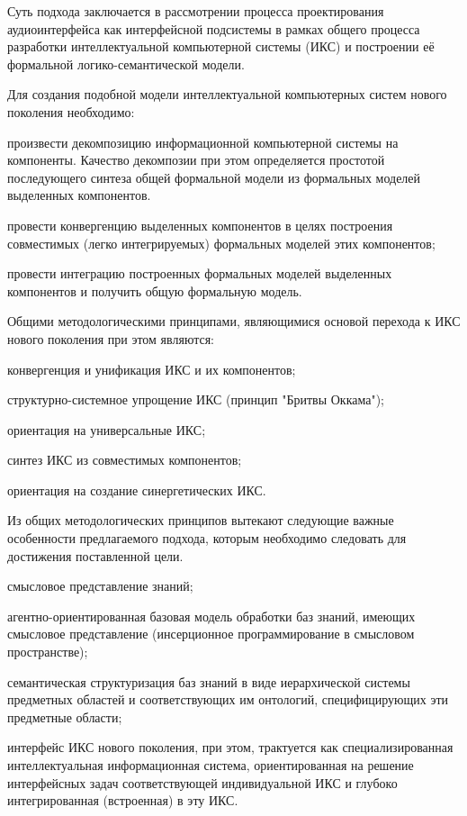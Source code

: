 Суть подхода заключается в рассмотрении процесса проектирования аудиоинтерфейса как интерфейсной подсистемы в рамках общего процесса разработки интеллектуальной компьютерной системы (ИКС) и построении её формальной логико-семантической модели.

Для создания подобной модели интеллектуальной компьютерных систем нового поколения необходимо:
\begin{textitemize}    
    \item произвести декомпозицию информационной компьютерной системы на компоненты. Качество декомпозии при этом определяется простотой последующего синтеза общей формальной модели из формальных моделей выделенных компонентов.
    \item провести конвергенцию выделенных компонентов в целях построения совместимых (легко интегрируемых) формальных моделей этих компонентов;
    \item провести интеграцию построенных формальных моделей выделенных компонентов и получить общую формальную модель.
\end{textitemize}

Общими методологическими принципами, являющимися основой перехода к ИКС нового поколения при этом являются:
\begin{textitemize}    
    \item конвергенция и унификация ИКС и их компонентов;
    \item структурно-системное упрощение ИКС (принцип "Бритвы Оккама");
    \item ориентация на универсальные ИКС;
    \item синтез ИКС из совместимых компонентов;
    \item ориентация на создание синергетических ИКС.
\end{textitemize}

Из общих методологических принципов вытекают следующие важные особенности предлагаемого подхода, которым необходимо следовать для достижения поставленной цели.
\begin{textitemize}    
    \item смысловое представление знаний;
    \item агентно-ориентированная базовая модель обработки баз знаний, имеющих смысловое представление (инсерционное программирование в смысловом пространстве);
    \item семантическая структуризация баз знаний в виде иерархической системы предметных областей и соответствующих им онтологий, специфицирующих эти предметные области;
    \item интерфейс ИКС нового поколения, при этом, трактуется как специализированная интеллектуальная информационная система, ориентированная на решение интерфейсных задач соответствующей индивидуальной ИКС и глубоко интегрированная (встроенная) в эту ИКС.
\end{textitemize}

